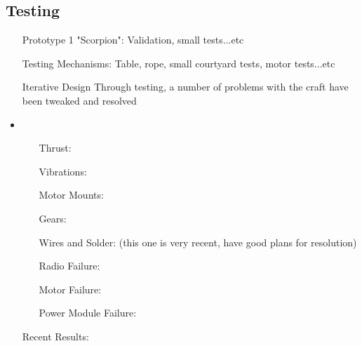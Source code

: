\subsection{Testing}
\begin{itemize}
\item[Prototype 1 "Scorpion":] Validation, small tests...etc
\item[Testing Mechanisms:] Table, rope, small courtyard tests, motor tests...etc
\item[Iterative Design] Through testing, a number of problems with the craft have been tweaked and resolved
\item\begin{itemize}
		\item[Thrust:]
		\item[Vibrations:]
		\item[Motor Mounts:]
		\item[Gears:]
		\item[Wires and Solder:] (this one is very recent, have good plans for resolution)
		\item[Radio Failure:]
		\item[Motor Failure:]
		\item[Power Module Failure:]
		
\end{itemize}
\item[Recent Results:]
\end{itemize}
